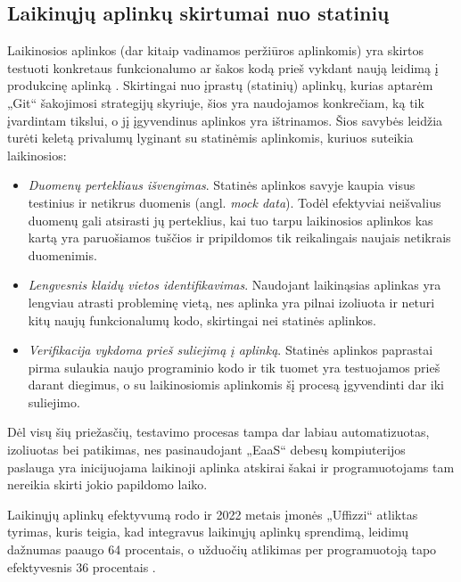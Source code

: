 \documentclass{VUMIFPSkursinis}
\begin{document}
\subsection{Laikinųjų aplinkų skirtumai nuo statinių}

Laikinosios aplinkos (dar kitaip vadinamos peržiūros aplinkomis) yra skirtos testuoti konkretaus funkcionalumo ar šakos kodą prieš vykdant naują leidimą į produkcinę aplinką \cite{SaltVienuoliktas}. Skirtingai nuo įprastų (statinių) aplinkų, kurias aptarėm „Git“ šakojimosi strategijų skyriuje, šios yra naudojamos konkrečiam, ką tik įvardintam tikslui, o jį įgyvendinus aplinkos yra ištrinamos. Šios savybės leidžia turėti keletą privalumų lyginant su statinėmis aplinkomis, kuriuos suteikia laikinosios:

\begin{itemize}
  \item \textit{Duomenų pertekliaus išvengimas}. Statinės aplinkos savyje kaupia visus testinius ir netikrus duomenis (angl. \textit{mock data}). Todėl efektyviai neišvalius duomenų gali atsirasti jų perteklius, kai tuo tarpu laikinosios aplinkos kas kartą yra paruošiamos tuščios ir pripildomos tik reikalingais naujais netikrais duomenimis.
  \item \textit{Lengvesnis klaidų vietos identifikavimas}. Naudojant laikinąsias aplinkas yra lengviau atrasti probleminę vietą, nes aplinka yra pilnai izoliuota ir neturi kitų naujų funkcionalumų kodo, skirtingai nei statinės aplinkos.
  \item \textit{Verifikacija vykdoma prieš suliejimą į aplinką}. Statinės aplinkos paprastai pirma sulaukia naujo programinio kodo ir tik tuomet yra testuojamos prieš darant diegimus, o su laikinosiomis aplinkomis šį procesą įgyvendinti dar iki suliejimo.
\end{itemize}

 Dėl visų šių priežasčių, testavimo procesas tampa dar labiau automatizuotas, izoliuotas bei patikimas, nes pasinaudojant „EaaS“ debesų kompiuterijos paslauga yra inicijuojama laikinoji aplinka atskirai šakai ir programuotojams tam nereikia skirti jokio papildomo laiko. 

Laikinųjų aplinkų efektyvumą rodo ir 2022 metais įmonės „Uffizzi“ atliktas tyrimas, kuris teigia, kad integravus laikinųjų aplinkų sprendimą, leidimų dažnumas paaugo 64 procentais, o užduočių atlikimas per programuotoją tapo efektyvesnis 36 procentais \cite{SaltDvyliktas}.
\end{document}
